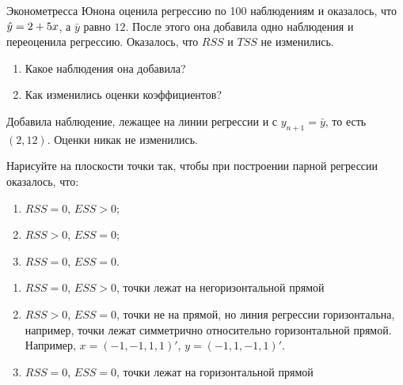 \begin{problem}
Эконометресса Юнона оценила регрессию по 100 наблюдениям и оказалось, что $\hat{y}=2+5x$, а $\bar{y}$ равно $12$. После этого она добавила одно наблюдения и переоценила регрессию. Оказалось, что $RSS$ и $TSS$ не изменились.
\begin{enumerate}
\item Какое наблюдения она добавила?
\item Как изменились оценки коэффициентов?
\end{enumerate}



\begin{sol}
Добавила наблюдение, лежащее на линии регрессии и с $y_{n+1}=\bar{y}$, то есть $(2,12)$. Оценки никак не изменились.
\end{sol}
\end{problem}



\begin{problem}
Нарисуйте на плоскости точки так, чтобы при построении парной регрессии оказалось, что:
\begin{enumerate}
\item $RSS=0$, $ESS>0$;
\item $RSS>0$, $ESS=0$;
\item $RSS=0$, $ESS=0$.
\end{enumerate}



\begin{sol}
\begin{enumerate}
\item $RSS=0$, $ESS>0$, точки лежат на негоризонтальной прямой
\item $RSS>0$, $ESS=0$, точки не на прямой, но линия регрессии горизонтальна, например, точки лежат симметрично относительно горизонтальной прямой. Например, \(x = (-1, -1, 1, 1)'\), \(y = (-1, 1, -1, 1)'\).
\item $RSS=0$, $ESS=0$, точки лежат на горизонтальной прямой
\end{enumerate}

\end{sol}
\end{problem}



